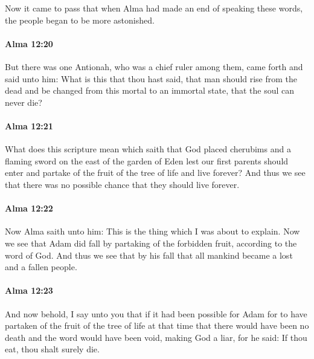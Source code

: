 			Now it came to pass that
			when Alma had made an end of speaking these words,
			the people began to be more astonished.

		\paragraph{Alma 12:20} %
			\label{ALMA-12-20}

			But there was one Antionah, who was a chief ruler among them,
			came forth and said unto him:
			What is this that thou hast said,
			that man should rise from the dead
			and be changed from this mortal to an immortal state,
			that the soul can never die?

		\paragraph{Alma 12:21} %
			\label{ALMA-12-21}

			What does this scripture mean which saith
			that God placed cherubims and a flaming sword
			on the east of the garden of Eden
			lest our first parents should enter
			and partake of the fruit of the tree of life and live forever?
			And thus we see that there was no possible chance
			that they should live forever.

		\paragraph{Alma 12:22} %
			\label{ALMA-12-22}

			Now Alma saith unto him:
			This is the thing which I was about to explain.
			Now we see that Adam did fall by partaking of the forbidden fruit,
			according to the word of God.
			And thus we see that by his fall
			that all mankind became a lost and a fallen people.

		\paragraph{Alma 12:23} %
			\label{ALMA-12-23}

			And now behold, I say unto you that
			if it had been possible for Adam
			for to have partaken of the fruit of the tree of life at that time
			that there would have been no death
			and the word would have been void,
			making God a liar,
			for he said:
			If thou eat, thou shalt surely die.

